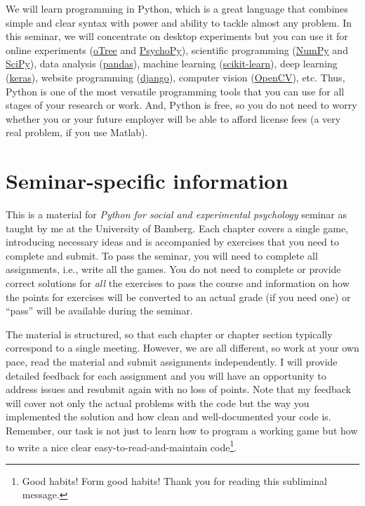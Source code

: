\documentclass[
]{book}
\begin{document}
We will learn programming in Python, which is a great language that combines simple and clear syntax with power and ability to tackle almost any problem. In this seminar, we will concentrate on desktop experiments but you can use it for online experiments (\href{https://otree.readthedocs.io/en/latest/}{oTree} and \href{https://psychopy.org/}{PsychoPy}), scientific programming (\href{https://numpy.org/}{NumPy} and \href{https://www.scipy.org/}{SciPy}), data analysis (\href{https://pandas.pydata.org/}{pandas}), machine learning (\href{https://scikit-learn.org/}{scikit-learn}), deep learning (\href{https://keras.io/}{keras}), website programming (\href{https://www.djangoproject.com/}{django}), computer vision (\href{https://opencv.org/}{OpenCV}), etc. Thus, Python is one of the most versatile programming tools that you can use for all stages of your research or work. And, Python is free, so you do not need to worry whether you or your future employer will be able to afford license fees (a very real problem, if you use Matlab).

\hypertarget{seminar-specific-information}{%
\section{Seminar-specific information}\label{seminar-specific-information}}

This is a material for \emph{Python for social and experimental psychology} seminar as taught by me at the University of Bamberg. Each chapter covers a single game, introducing necessary ideas and is accompanied by exercises that you need to complete and submit. To pass the seminar, you will need to complete all assignments, i.e., write all the games. You do not need to complete or provide correct solutions for \emph{all} the exercises to pass the course and information on how the points for exercises will be converted to an actual grade (if you need one) or ``pass'' will be available during the seminar.

The material is structured, so that each chapter or chapter section typically correspond to a single meeting. However, we are all different, so work at your own pace, read the material and submit assignments independently. I will provide detailed feedback for each assignment and you will have an opportunity to address issues and resubmit again with no loss of points. Note that my feedback will cover not only the actual problems with the code but the way you implemented the solution and how clean and well-documented your code is. Remember, our task is not just to learn how to program a working game but how to write a nice clear easy-to-read-and-maintain code\footnote{Good habits! Form good habits! Thank you for reading this subliminal message.}.
\end{document}
